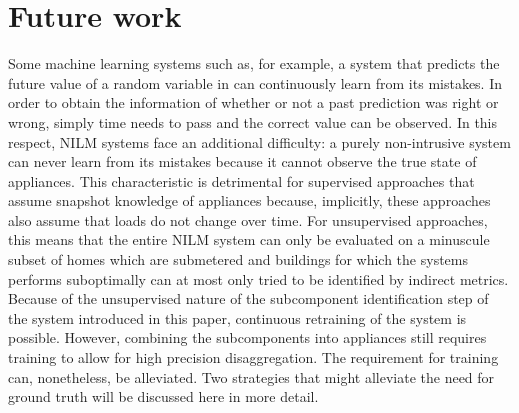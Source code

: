 \section{Future work}

Some machine learning systems such as, for example, a system that predicts the future value of a random variable in can continuously learn from its mistakes. In order to obtain the information of whether or not a past prediction was right or wrong, simply time needs to pass and the correct value can be observed. In this respect, NILM systems face an additional difficulty: a purely non-intrusive system can never learn from its mistakes because it cannot observe the true state of appliances. This characteristic is detrimental for supervised approaches that assume snapshot knowledge of appliances because, implicitly, these approaches also assume that loads do not change over time. For unsupervised approaches, this means that the entire NILM system can only be evaluated on a minuscule subset of homes which are submetered and buildings for which the systems performs suboptimally can at most only tried to be identified by indirect metrics. Because of the unsupervised nature of the subcomponent identification step of the system introduced in this paper, continuous retraining of the system is possible. However, combining the subcomponents into appliances still requires training to allow for high precision disaggregation. The requirement for training can, nonetheless, be alleviated. Two strategies that might alleviate the need for ground truth will be discussed here in more detail.
